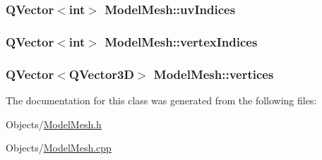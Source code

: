 \subsubsection[{uv\+Indices}]{\setlength{\rightskip}{0pt plus 5cm}Q\+Vector$<$int$>$ Model\+Mesh\+::uv\+Indices}\label{class_model_mesh_a11bdfe8b89a8edc92ffb913e68ad809b}
\hypertarget{class_model_mesh_acfba0ca825dfe69c518f3ba9ce600965}{}
\subsubsection[{vertex\+Indices}]{\setlength{\rightskip}{0pt plus 5cm}Q\+Vector$<$int$>$ Model\+Mesh\+::vertex\+Indices}\label{class_model_mesh_acfba0ca825dfe69c518f3ba9ce600965}
\hypertarget{class_model_mesh_a025988c601aaf8c42d5f1a7ff75c9f40}{}
\subsubsection[{vertices}]{\setlength{\rightskip}{0pt plus 5cm}Q\+Vector$<$Q\+Vector3\+D$>$ Model\+Mesh\+::vertices}\label{class_model_mesh_a025988c601aaf8c42d5f1a7ff75c9f40}


The documentation for this class was generated from the following files\+:\begin{DoxyCompactItemize}
\item 
Objects/\hyperlink{_model_mesh_8h}{Model\+Mesh.\+h}\item 
Objects/\hyperlink{_model_mesh_8cpp}{Model\+Mesh.\+cpp}\end{DoxyCompactItemize}
